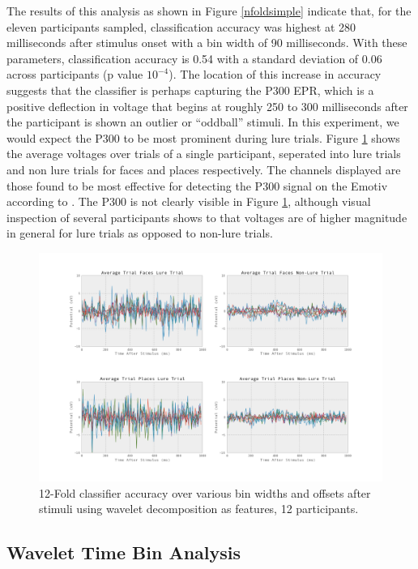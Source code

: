 \documentclass[11pt]{report}
\begin{document}
The results of this analysis as shown in Figure \ref{nfoldsimple} indicate that, for the eleven participants sampled, classification accuracy was highest at 280 milliseconds after stimulus onset with a bin width of 90 milliseconds.  With these parameters, classification accuracy is 0.54 with a standard deviation of 0.06 across participants (p value $10^{-4}$).  The location of this increase in accuracy suggests that the classifier is perhaps capturing the P300 EPR, which is a positive deflection in voltage that begins at roughly 250 to 300 milliseconds after the participant is shown an outlier or ``oddball'' stimuli\cite{p300}.  In this experiment, we would expect the P300 to be most prominent during lure trials.  Figure \ref{luresvsnonlures300} shows the average voltages over trials of a single participant, seperated into lure trials and non lure trials for faces and places respectively.  The channels displayed are those found to be most effective for detecting the P300 signal on the Emotiv according to \cite{Ekanayake}.  The P300 is not clearly visible in Figure \ref{luresvsnonlures300}, although visual inspection of several participants shows to that voltages are of higher magnitude in general for lure trials as opposed to non-lure trials.  

     
\begin{figure}[t]
\centerline{
\includegraphics[width=7in]{lurevsnonlurep300}
}
\caption{12-Fold classifier accuracy over various bin widths and offsets after stimuli using wavelet decomposition as features, 12 participants.\label{luresvsnonlures300}}
\end{figure}

\subsection{Wavelet Time Bin Analysis}
\end{document}
